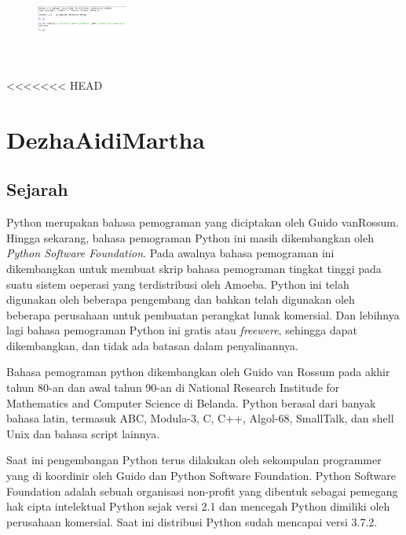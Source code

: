     \begin{figure}[H]
        \centering
        \includegraphics[width=3cm,height=3cm]{figures/oni/11.png}
        \label{akhir}
        \end{figure}

<<<<<<< HEAD


\section{DezhaAidiMartha}

\subsection{Sejarah}
Python merupakan bahasa pemograman yang diciptakan oleh Guido vanRossum. Hingga sekarang, bahasa pemograman Python ini masih dikembangkan oleh \textit{Python Software Foundation}. Pada awalnya bahasa pemograman ini dikembangkan untuk membuat skrip bahasa pemograman tingkat tinggi pada suatu sistem oeperasi yang terdistribusi oleh Amoeba. Python ini telah digunakan oleh beberapa pengembang dan bahkan telah digunakan oleh beberapa perusahaan untuk pembuatan perangkat lunak komersial. Dan lebihnya lagi bahasa pemograman Python ini gratis atau \textit{freewere}, sehingga dapat dikembangkan, dan tidak ada batasan dalam penyalinannya.

Bahasa pemograman python dikembangkan oleh Guido van Rossum pada akhir tahun 80-an dan awal tahun 90-an di National Research Institude for Mathematics and Computer Science di Belanda. Python berasal dari banyak bahasa latin, termasuk ABC, Modula-3, C, C++, Algol-68, SmallTalk, dan shell Unix dan bahasa script lainnya.

Saat ini pengembangan Python terus dilakukan oleh sekompulan programmer yang di koordinir oleh Guido dan Python Software Foundation. Python Software Foundation adalah sebuah organisasi non-profit yang dibentuk sebagai pemegang hak cipta intelektual Python sejak versi 2.1 dan mencegah Python dimiliki oleh perusahaan komersial. Saat ini distribusi Python sudah mencapai versi 3.7.2.

